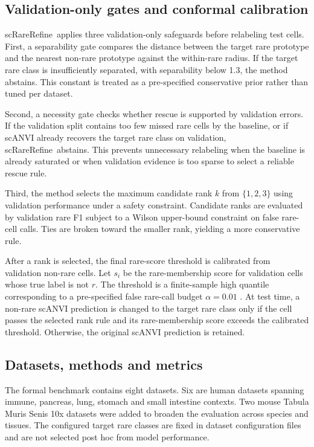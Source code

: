 \documentclass[11pt]{article}
\newcommand{\method}{scRareRefine}
\newcommand{\rare}{r}
\begin{document}
\subsection{Validation-only gates and conformal calibration}

\method\ applies three validation-only safeguards before relabeling test cells.
First, a separability gate compares the distance between the target rare
prototype and the nearest non-rare prototype against the within-rare radius. If
the target rare class is insufficiently separated, with separability below 1.3,
the method abstains. This constant is treated as a pre-specified conservative
prior rather than tuned per dataset.

Second, a necessity gate checks whether rescue is supported by validation
errors. If the validation split contains too few missed rare cells by the
baseline, or if scANVI already recovers the target rare class on validation,
\method\ abstains. This prevents unnecessary relabeling when the baseline is
already saturated or when validation evidence is too sparse to select a
reliable rescue rule.

Third, the method selects the maximum candidate rank $k$ from $\{1,2,3\}$ using
validation performance under a safety constraint. Candidate ranks are evaluated
by validation rare F1 subject to a Wilson upper-bound constraint on false
rare-cell calls. Ties are broken toward the smaller rank, yielding a more
conservative rule.

After a rank is selected, the final rare-score threshold is calibrated from
validation non-rare cells. Let $s_i$ be the rare-membership score for validation
cells whose true label is not $\rare$. The threshold is a finite-sample high
quantile corresponding to a pre-specified false rare-call budget $\alpha=0.01$
\citep{vovk2005algorithmic,angelopoulos2023conformal}. At test time, a non-rare
scANVI prediction is changed to the target rare class only if the cell passes
the selected rank rule and its rare-membership score exceeds the calibrated
threshold. Otherwise, the original scANVI prediction is retained.

\subsection{Datasets, methods and metrics}

The formal benchmark contains eight datasets. Six are human datasets spanning
immune, pancreas, lung, stomach and small intestine contexts. Two mouse Tabula
Muris Senis 10x datasets were added to broaden the evaluation across species
and tissues. The configured target rare classes are fixed in dataset
configuration files and are not selected post hoc from model performance.
\end{document}
